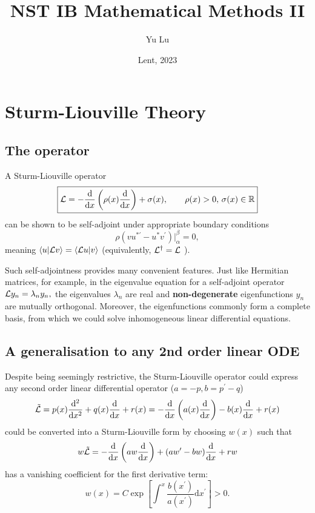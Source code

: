 \documentclass{article}
\title{NST IB Mathematical Methods II}
\date{Lent, 2023}
\author{Yu Lu}
\begin{document}
\maketitle
\tableofcontents

\section{Sturm-Liouville Theory}
\subsection{The operator}
A Sturm-Liouville operator
\[
\boxed{
    \mathcal{\MakeUppercase{L}} 
    = -\frac{\mathrm{d}}{\mathrm{d}x} \left( \rho (x) \frac{\mathrm{d}}{\mathrm{d}x}   \right) + \sigma(x), \qquad \rho(x) >0, \, \sigma(x) \in \mathbb{\MakeUppercase{R}} 
}
\]
can be shown to be self-adjoint under appropriate boundary conditions
\[
    \rho \left( vu^{*\prime} - u^* v^\prime \right)\big\rvert_\alpha ^\beta =0,
\]
meaning \( \braket{u}{\mathcal{\MakeUppercase{L}} v} = \braket{\mathcal{\MakeUppercase{L}} u}{v}\) (equivalently, \( {\mathcal{\MakeUppercase{L}} }^{\dagger} = \mathcal{\MakeUppercase{L}} \) ). 

Such self-adjointness provides many convenient features. Just like Hermitian matrices, for example, in the eigenvalue equation for a self-adjoint operator \(\mathcal{\MakeUppercase{L}} y_n = \lambda_{n} y_{n}, \) the eigenvalues $\lambda_{n} $ are real and \textbf{non-degenerate} eigenfunctions $y_n$ are mutually orthogonal. Moreover, the eigenfunctions commonly form a complete basis, from which we could solve inhomogeneous linear differential equations. 

\subsection{A generalisation to any 2nd order linear ODE}
Despite being seemingly restrictive, the Sturm-Liouville operator could express any second order linear differential operator ($a = -p, b = p^\prime -q$)
\[
    \tilde{\mathcal{\MakeUppercase{L}}}
    = p(x) \frac{\mathrm{d}^{2} }{\mathrm{d}x^{2} } + q(x) \frac{\mathrm{d}}{\mathrm{d}x} + r(x)
    = -\frac{\mathrm{d}}{\mathrm{d}x} \left( a(x) \frac{\mathrm{d}}{\mathrm{d}x} \right) - b(x) \frac{\mathrm{d}}{\mathrm{d}x} +r(x)
\]
could be converted into a Sturm-Liouville form by choosing $w(x)$ such that 
\[
    w \tilde{\mathcal{\MakeUppercase{L}} } = 
    - \frac{\mathrm{d}}{\mathrm{d}x} \left( a w \frac{\mathrm{d}}{\mathrm{d}x} \right) + 
    (a w^\prime  - b w) \frac{\mathrm{d}}{\mathrm{d}x} + r w
\]
has a vanishing coefficient for the first derivative term: 
\[ \boxed{
    w(x) = C \exp\left[ \int^x \frac{b(x^\prime )}{a(x^\prime )}\mathrm{d} x^\prime \right] > 0.}
\] 
\end{document}
